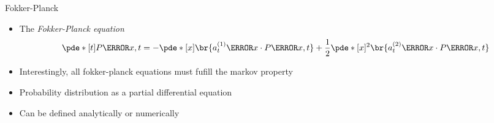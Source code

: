 \documentclass[aspectratio=169]{RUCPresentation}
\begin{document}
\begin{frame}{Fokker-Planck}

    \begin{itemize}
        \item The \emph{Fokker-Planck equation}
            \begin{equation*}
                \pde*[t] P\of{x,t} = 
                -\pde*[x] \br{a^{(1)}_t \of x \cdot P\of{x,t}} + 
                {1 \over 2} \pde*[x]^2 \br{a^{(2)}_t \of x\cdot P\of{x,t}}
            \end{equation*}

        \item Interestingly, all fokker-planck equations must fufill the markov property
        \item Probability distribution as a partial differential equation
        \item Can be defined analytically or numerically
    \end{itemize}
    
\end{frame}
\end{document}
